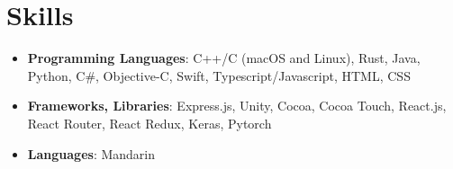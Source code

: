 \documentclass[10pt, letterpaper]{article}
\begin{document}
  \section{Skills}
  \begin{itemize}
    \item \textbf{Programming Languages}: C++/C (macOS and Linux), Rust, Java,
    Python, C\#, Objective-C, Swift, Typescript/Javascript, HTML, CSS
    \item \textbf{Frameworks, Libraries}: Express.js, Unity, Cocoa, Cocoa Touch,
    React.js, React Router, React Redux, Keras, Pytorch
    \item \textbf{Languages}: Mandarin
  \end{itemize}
\end{document}
